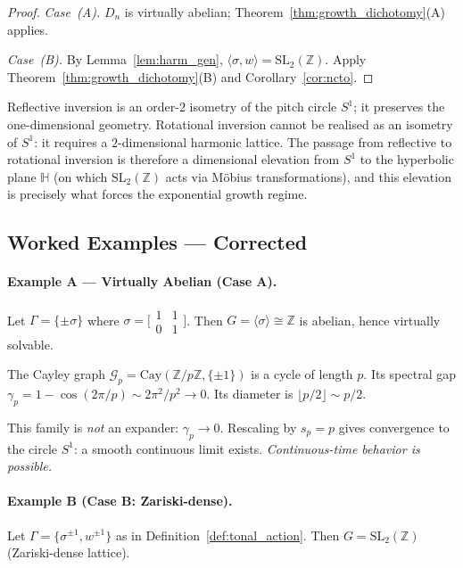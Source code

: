 \begin{proof}
  \emph{Case~(A).}  $D_n$ is virtually abelian;
  Theorem~\ref{thm:growth_dichotomy}(A) applies.

  \emph{Case~(B).}  By Lemma~\ref{lem:harm_gen},
  $\langle\sigma, w\rangle = \mathrm{SL}_2(\mathbb{Z})$.
  Apply Theorem~\ref{thm:growth_dichotomy}(B) and Corollary~\ref{cor:ncto}.
\end{proof}

\begin{remark}
  \label{rem:dim_elevation}
  Reflective inversion is an order-$2$ isometry of the pitch circle $S^1$; it
  preserves the one-dimensional geometry.  Rotational inversion cannot be realised
  as an isometry of $S^1$: it requires a $2$-dimensional harmonic lattice.
  The passage from reflective to rotational inversion is therefore a dimensional
  elevation from $S^1$ to the hyperbolic plane $\mathbb{H}$ (on which
  $\mathrm{SL}_2(\mathbb{Z})$ acts via M\"{o}bius transformations), and this
  elevation is precisely what forces the exponential growth regime.
\end{remark}

\subsection{Worked Examples --- Corrected}
\label{sec:harmonic:examples}

\paragraph{Example A --- Virtually Abelian (Case A).}
Let $\Gamma = \{\pm\sigma\}$ where $\sigma = \bigl[\begin{smallmatrix}1&1\\0&1\end{smallmatrix}\bigr]$.
Then $G = \langle \sigma \rangle \cong \mathbb{Z}$ is abelian, hence virtually solvable.

The Cayley graph $\mathcal{G}_p = \mathrm{Cay}(\mathbb{Z}/p\mathbb{Z}, \{\pm 1\})$ is a
cycle of length $p$.  Its spectral gap $\gamma_p = 1 - \cos(2\pi/p) \sim 2\pi^2/p^2 \to 0$.
Its diameter is $\lfloor p/2 \rfloor \sim p/2$.

This family is \emph{not} an expander: $\gamma_p \to 0$.  Rescaling by $s_p = p$
gives convergence to the circle $S^1$: a smooth continuous limit exists.
\emph{Continuous-time behavior is possible.}

\paragraph{Example B (Case B: Zariski-dense).}
Let $\Gamma = \{\sigma^{\pm 1}, w^{\pm 1}\}$ as in Definition~\ref{def:tonal_action}.
Then $G = \mathrm{SL}_2(\mathbb{Z})$ (Zariski-dense lattice).

